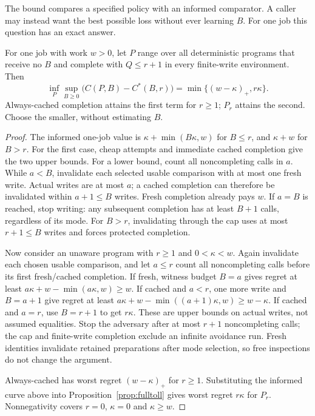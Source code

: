 The bound compares a specified policy with an informed comparator. A caller may instead want the best possible loss without ever learning $B$. For one job this question has an exact answer.
\begin{proposition}
\label{prop:regret}
For one job with work $w>0$, let $P$ range over all deterministic programs that receive no $B$ and complete with $Q\le r+1$ in every finite-write environment. Then
\[
 \inf_P\sup_{B\ge0}\bigl(C(P,B)-C^*(B,r)\bigr)
 =\min\{(w-\kappa)_+,r\kappa\}.
\]
Always-cached completion attains the first term for $r\ge1$; $P_r$ attains the second. Choose the smaller, without estimating $B$.
\end{proposition}
\begin{proof}
The informed one-job value is $\kappa+\min(B\kappa,w)$ for $B\le r$, and $\kappa+w$ for $B>r$. For the first case, cheap attempts and immediate cached completion give the two upper bounds. For a lower bound, count all noncompleting calls in $a$. While $a<B$, invalidate each selected usable comparison with at most one fresh write. Actual writes are at most $a$; a cached completion can therefore be invalidated within $a+1\le B$ writes. Fresh completion already pays $w$. If $a=B$ is reached, stop writing: any subsequent completion has at least $B+1$ calls, regardless of its mode. For $B>r$, invalidating through the cap uses at most $r+1\le B$ writes and forces protected completion.

Now consider an unaware program with $r\ge1$ and $0<\kappa<w$. Again invalidate each chosen usable comparison, and let $a\le r$ count all noncompleting calls before its first fresh/cached completion. If fresh, witness budget $B=a$ gives regret at least $a\kappa+w-\min(a\kappa,w)\ge w$. If cached and $a<r$, one more write and $B=a+1$ give regret at least $a\kappa+w-\min((a+1)\kappa,w)\ge w-\kappa$. If cached and $a=r$, use $B=r+1$ to get $r\kappa$. These are upper bounds on actual writes, not assumed equalities. Stop the adversary after at most $r+1$ noncompleting calls; the cap and finite-write completion exclude an infinite avoidance run. Fresh identities invalidate retained preparations after mode selection, so free inspections do not change the argument.

Always-cached has worst regret $(w-\kappa)_+$ for $r\ge1$. Substituting the informed curve above into Proposition~\ref{prop:fulltoll} gives worst regret $r\kappa$ for $P_r$. Nonnegativity covers $r=0$, $\kappa=0$ and $\kappa\ge w$.
\end{proof}

